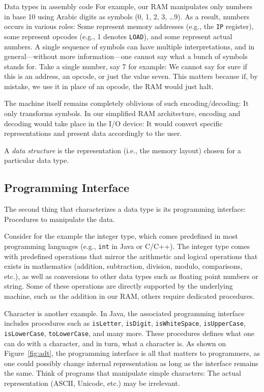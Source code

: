 \documentclass{aldast}
\begin{document}
\begin{note}{Data types in assembly code}
  For example, our RAM manipulates only numbers in base 10 using
  Arabic digits as symbols (0, 1, 2, 3, \ldots 9). As a result,
  numbers occurs in various roles: Some represent memory addresses
  (e.g., the \texttt{IP} register), some represent opcodes (e.g., 1
  denotes \texttt{LOAD}), and some represent actual numbers. A single
  sequence of symbols can have multiple interpretations, and in
  general---without more information---one cannot say what a bunch of
  symbols stands for. Take a single number, say 7 for example: We
  cannot say for sure if this is an address, an opcode, or just the
  value seven. This matters because if, by mistake, we use it in
  place of an opcode, the RAM would just halt.
\end{note}

The machine itself remains completely oblivious of such
encoding/decoding: It only transforms symbols. In our simplified RAM
architecture, encoding and decoding would take place in the I/O
device: It would convert specific representations and present
data accordingly to the user.

\begin{takeaway}
  A \emph{data structure} is the representation (i.e., the memory layout)
  chosen for a particular data type.
\end{takeaway}

\subsection{Programming Interface}

The second thing that characterizes a data type is its programming
interface: Procedures to manipulate the data.

Consider for the example the integer type, which comes predefined in
most programming languages (e.g., \texttt{int} in Java or C/C++). The
integer type comes with predefined operations that mirror the
arithmetic and logical operations that exists in mathematics
(addition, subtraction, division, modulo, comparisons, etc.), as well
as conversions to other data types such as floating point numbers or
string. Some of these operations are directly supported by the
underlying machine, such as the addition in our RAM, others require
dedicated procedures.

Character is another example. In Java, the associated programming
interface includes procedures such as \texttt{isLetter},
\texttt{isDigit}, \texttt{isWhiteSpace}, \texttt{isUpperCase},
\texttt{isLowerCase}, \texttt{toLowerCase}, and many more. These
procedures defines what one can do with a character, and in turn, what
a character is. As shown on Figure~\ref{fig:adt}, the programming
interface is all that matters to programmers, as one could possibly
change internal representation as long as the interface remains the
same. Think of programs that manipulate simple characters: The actual
representation (ASCII, Unicode, etc.) may be irrelevant.
\end{document}
